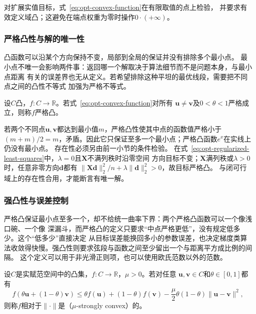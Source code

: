 对扩展实值目标，式~\eqref{eq:opt-convex-function}在有限取值的点上检验，
并要求有效定义域凸；这避免在端点权重为零时操作$0\cdot(+\infty)$。

\subsubsection{严格凸性与解的唯一性}

凸函数可以沿某个方向保持不变，局部到全局的保证并没有排除多个最小点。
最小点不唯一会影响两件事：返回哪一个解取决于算法细节而不是问题本身，与最小点距离
有关的误差界也无从定义。若希望排除这种平坦的最优线段，需要把不同点之间的凸性不等式
加强为严格不等式。
\begin{definition}[严格凸函数]
\label{def:opt-strict-convexity}
设$C$凸，$f:C\to\mathbb R$。若式~\eqref{eq:opt-convex-function}对所有
$\bm u\neq\bm v$及$0<\theta<1$严格成立，则称$f$严格凸。
\end{definition}
若两个不同点$\bm u,\bm v$都达到最小值$m$，严格凸性使其中点的函数值严格小于
$(m+m)/2=m$，矛盾。因此它只保证至多一个最小点；严格凸函数$e^x$在实线上仍没有最小点。
存在性必须另由前一小节的条件检验。
在式~\eqref{eq:opt-regularized-least-squares}中，$\lambda=0$且$\bm X$不满列秩时沿零空间
方向目标不变；$\bm X$满列秩或$\lambda>0$时，任意非零方向$\bm d$都有
$\|\bm X\bm d\|_2^2/n+\lambda\|\bm d\|_2^2>0$，故目标严格凸。
与闭可行域上的存在性合用，才能断言有唯一解。

\subsubsection{强凸性与误差控制}

严格凸保证最小点至多一个，却不给统一曲率下界：两个严格凸函数可以一个像浅口碗、一个像
深漏斗，而严格凸的定义只要求“中点严格更低”，没有规定低多少。这个“低多少”直接决定
从目标误差能换回多小的参数误差，也决定梯度类算法收敛得快慢。强凸性则要求弦段与函数之间至少留出一个与距离平方成比例的间隔。
这个定义可以用于非光滑正则项，也可以使用欧氏范数以外的范数。

\begin{definition}[相对于范数的强凸性]
\label{def:opt-strong-convexity}
设$C$是实赋范空间中的凸集，$f:C\to\mathbb{R}$，$\mu>0$。若对任意
$\bm{u},\bm{v}\in C$和$\theta\in[0,1]$都有
\begin{equation}
 f(\theta\bm{u}+(1-\theta)\bm{v})
 \leq\theta f(\bm{u})+(1-\theta)f(\bm{v})
 -\frac{\mu}{2}\theta(1-\theta)\lVert\bm{u}-\bm{v}\rVert^2,
 \label{eq:opt-norm-strong-convexity}
\end{equation}
则称$f$相对于$\lVert\cdot\rVert$是（$\mu$-strongly convex）的。
\end{definition}

